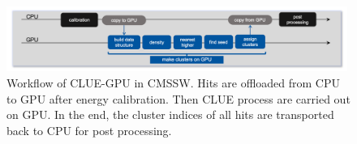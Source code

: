 

\begin{figure}[ht]
    \centering
    \includegraphics[trim=0.5cm 0cm 0.5cm 0cm, clip,width=0.99\textwidth]{chapters/HGCal/figures/chep/CMSSWFollow.png}
    \caption{ Workflow of CLUE-GPU in CMSSW. Hits are offloaded from CPU to GPU after energy calibration. Then CLUE process are carried out on GPU. In the end, the cluster indices of all hits are transported back to CPU for post processing.}
    \label{fig:cmssw}
\end{figure}


